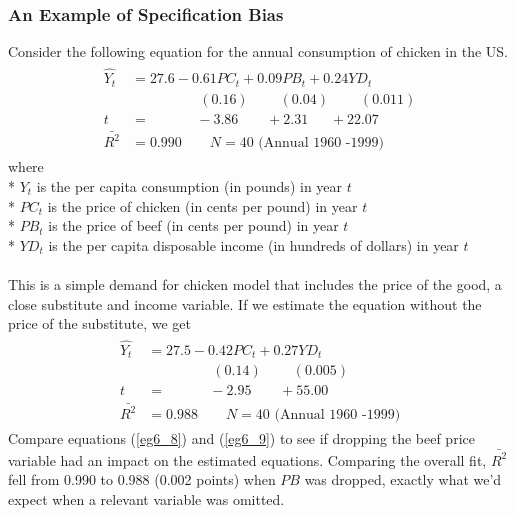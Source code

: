 \documentclass[11pt]{article}
\begin{document}
\subsubsection{An Example of Specification Bias}
Consider the following equation for the annual consumption of chicken in the US.
\begin{align}
\label{eg6_8}
\begin{split}
\hat{Y_t} &= 27.6 - {0.61PC_t} + {0.09PB_t} + {0.24YD_t}\\
&\>\>\>\>\>\>\>\>\>\>\>\>\>\>\>\>\>\>\>\>\>\> (0.16) 
\>\>\>\>\>\>\>\>\>\> (0.04)
\>\>\>\>\>\>\>\>\>\> (0.011)\\
t&=\>\>\>\>\>\>\>\>\>\>\>\>\>\>\> -3.86 
\>\>\>\>\>\>\>\>\> +2.31
\>\>\>\>\>\>\> +22.07\\
\bar{R^2}&= 0.990 \quad\quad N=40 \text{  (Annual 1960 -1999)}
\end{split}
\end{align}
where\\*
$Y_t$ is the per capita consumption (in pounds) in year $t$\\*
$PC_t$ is the price of chicken (in cents per pound) in year $t$\\*
$PB_t$ is the price of beef (in cents per pound) in year $t$\\*
$YD_t$ is the per capita disposable income (in hundreds of dollars) in year $t$\\ \\
This is a simple demand for chicken model that includes the price of the good, a close substitute and income variable. If we estimate the equation without the price of the substitute, we get
\begin{align}
\label{eg6_9}
\begin{split}
\hat{Y_t} &= 27.5 - {0.42PC_t} + {0.27YD_t}\\
&\>\>\>\>\>\>\>\>\>\>\>\>\>\>\>\>\>\>\>\>\> (0.14) 
\>\>\>\>\>\>\>\>\>\> (0.005)\\
t&=\>\>\>\>\>\>\>\>\>\>\>\>\>\> -2.95 
\>\>\>\>\>\>\>\>\> +55.00\\
\bar{R^2}&= 0.988 \quad\quad N=40 \text{  (Annual 1960 -1999)}
\end{split}
\end{align}
Compare equations (\ref{eg6_8}) and (\ref{eg6_9}) to see if dropping the beef price variable had an impact on the estimated equations. Comparing the overall fit, $\bar{R^2}$ fell from 0.990 to 0.988 (0.002 points) when $PB$ was dropped, exactly what we'd expect when a relevant variable was omitted.\\ \\
\end{document}

